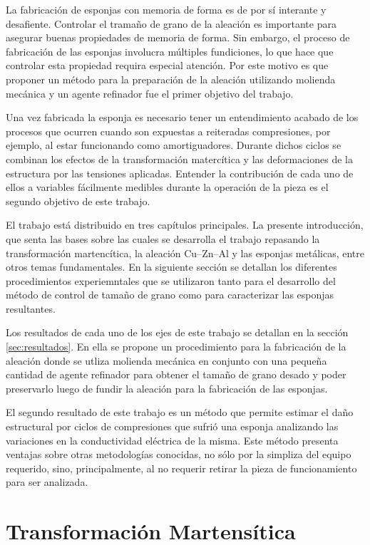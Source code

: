 \documentclass[a4paper,12pt,fleqn,twoside,openany]{book}
\begin{document}
La fabricación de esponjas con memoria de forma es de por sí interante y desafiente. Controlar el tramaño de grano de la aleación es importante para asegurar buenas propiedades de memoria de forma. Sin embargo, el proceso de fabricación de las esponjas involucra múltiples fundiciones, lo que hace que controlar esta propiedad requira especial atención. Por este motivo es que proponer un método para la preparación de la aleación utilizando molienda mecánica y un agente refinador fue el primer objetivo del trabajo.

Una vez fabricada la esponja es necesario tener un entendimiento acabado de los procesos que ocurren cuando son expuestas a reiteradas compresiones, por ejemplo, al estar funcionando como amortiguadores. Durante dichos ciclos se combinan los efectos de la transformación matercítica y las deformaciones de la estructura por las tensiones aplicadas. Entender la contribución de cada uno de ellos a variables fácilmente medibles durante la operación de la pieza es el segundo objetivo de este trabajo.

El trabajo está distribuido en tres capítulos principales. La presente introducción, que senta las bases sobre las cuales se desarrolla el trabajo repasando la transformación martencítica, la aleación Cu–Zn–Al y las esponjas metálicas, entre otros temas fundamentales. En la siguiente sección se detallan los diferentes procedimientos experiemntales que se utilizaron tanto para el desarrollo del método de control de tamaño de grano como para caracterizar las esponjas resultantes.

Los resultados de cada uno de los ejes de este trabajo se detallan en la sección \ref{sec:resultados}. En ella se propone un procedimiento para la fabricación de la aleación donde se utliza molienda mecánica en conjunto con una pequeña cantidad de agente refinador para obtener el tamaño de grano desado y poder preservarlo luego de fundir la aleación para la fabricación de las esponjas.

El segundo resultado de este trabajo es un método que permite estimar el daño estructural por ciclos de compresiones que sufrió una esponja analizando las variaciones en la conductividad eléctrica de la misma. Este método presenta ventajas sobre otras metodologías conocidas, no sólo por la simpliza del equipo requerido, sino, principalmente, al no requerir retirar la pieza de funcionamiento para ser analizada.

\section{Transformación Martensítica}
\end{document}
